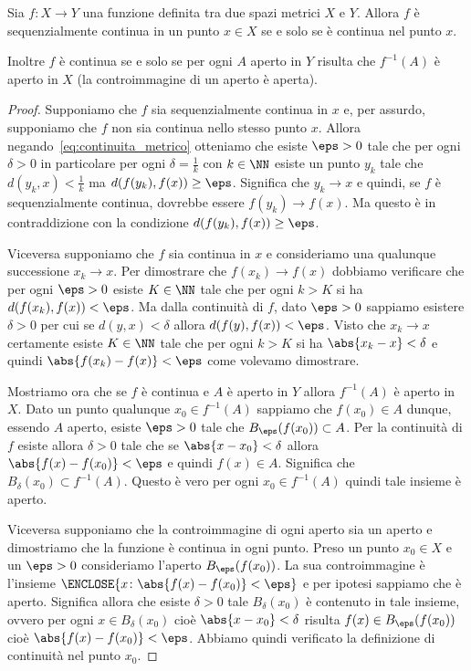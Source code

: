 \begin{theorem}
Sia $f\colon X \to Y$ una funzione definita tra due spazi metrici $X$ e $Y$.
Allora $f$ è sequenzialmente continua in un punto $x\in X$ se e solo se è
continua nel punto $x$.

Inoltre $f$ è continua se e solo se
per ogni $A$ aperto in $Y$ risulta che $f^{-1}(A)$ è aperto in $X$
(la controimmagine di un aperto è aperta).
\end{theorem}
%
\begin{proof}
Supponiamo che $f$ sia sequenzialmente continua in $x$
e, per assurdo, supponiamo che $f$ non sia continua nello stesso punto $x$.
Allora negando~\eqref{eq:continuita_metrico} otteniamo che esiste $\eps>0$
tale che per ogni $\delta>0$ in particolare per ogni $\delta = \frac{1}{k}$
con $k\in \NN$ esiste un punto $y_k$ tale che $d(y_k,x)<\frac 1 k$ ma
$d(f(y_k),f(x))\ge \eps$. Significa che $y_k \to x$ e quindi,
se $f$ è sequenzialmente continua, dovrebbe essere $f(y_k)\to f(x)$. Ma
questo è in contraddizione con la condizione $d(f(y_k),f(x))\ge \eps$.

Viceversa supponiamo che $f$ sia continua in $x$ e consideriamo una qualunque
successione $x_k \to x$.
Per dimostrare che $f(x_k)\to f(x)$ dobbiamo verificare che per ogni
$\eps>0$ esiste $K\in \NN$ tale che per ogni $k>K$ si ha $d(f(x_k),f(x)) < \eps$.
Ma dalla continuità di $f$, dato $\eps>0$ sappiamo esistere $\delta>0$ per cui
se $d(y,x)<\delta$ allora $d(f(y),f(x))<\eps$. Visto che $x_k\to x$
certamente esiste $K\in \NN$ tale che per ogni $k>K$ si ha $\abs{x_k-x}<\delta$
e quindi $\abs{f(x_k)-f(x)}< \eps$ come volevamo dimostrare.

Mostriamo ora che se $f$ è continua e $A$ è aperto in $Y$ allora $f^{-1}(A)$
è aperto in $X$.
Dato un punto qualunque $x_0\in f^{-1}(A)$ sappiamo che $f(x_0)\in A$ dunque, essendo
$A$ aperto, esiste $\eps>0$ tale che $B_\eps(f(x_0))\subset A$.
Per la continuità di $f$ esiste allora $\delta>0$ tale che se $\abs{x-x_0} < \delta$
allora $\abs{f(x)-f(x_0)}<\eps$ e quindi $f(x)\in A$. Significa che $B_\delta(x_0)\subset f^{-1}(A)$.
Questo è vero per ogni $x_0\in f^{-1}(A)$ quindi tale insieme è aperto.

Viceversa supponiamo che la controimmagine di ogni aperto sia un aperto e
dimostriamo che la funzione è continua in ogni punto.
Preso un punto $x_0\in X$ e un $\eps>0$ consideriamo l'aperto $B_\eps(f(x_0))$.
La sua controimmagine è l'insieme $\ENCLOSE{x\colon \abs{f(x)-f(x_0)} < \eps}$ e
per ipotesi sappiamo che è aperto. Significa allora che esiste $\delta>0$
tale $B_\delta(x_0)$ è contenuto in tale insieme, ovvero per ogni $x\in B_\delta(x_0)$
cioè $\abs{x-x_0}<\delta$
risulta $f(x) \in B_\eps(f(x_0))$
cioè $\abs{f(x)-f(x_0)}<\eps$.
Abbiamo quindi verificato la definizione di
continuità nel punto $x_0$.
\end{proof}

